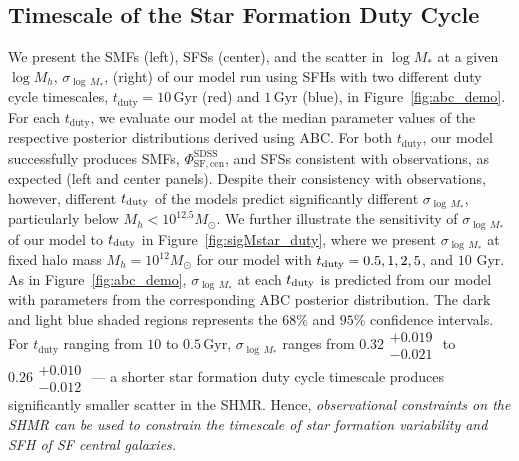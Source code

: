 \documentclass[12pt, letterpaper, preprint, tighten]{aastex62}
\begin{document}
\subsection{Timescale of the Star Formation Duty Cycle} \label{sec:sfdutycycle}
We present the SMFs (left), SFSs (center), and the scatter in $\log M_*$ at a 
given $\log M_h$, $\sigma_{\log\,M_*}$, (right) of our model run using SFHs with 
two different duty cycle timescales, $t_\mathrm{duty} = 10\,\mathrm{Gyr}$ (red) 
and $1\,\mathrm{Gyr}$ (blue), in Figure~\ref{fig:abc_demo}. For each 
$t_\mathrm{duty}$, we evaluate our model at the median parameter values of the respective posterior distributions derived 
using ABC. For both $t_\mathrm{duty}$, our model successfully produces SMFs, 
$\Phi^\mathrm{SDSS}_\mathrm{SF,cen}$, and SFSs consistent with observations, 
as expected (left and center panels). Despite their consistency with observations, 
however, different $t_{\rm duty}$ of the models predict significantly different 
$\sigma_{\log\,M_*}$, particularly below $M_h < 10^{12.5}M_\odot$. We further
illustrate the sensitivity of $\sigma_{\log\,M_*}$ of our model to $t_{\rm duty}$
in Figure~\ref{fig:sigMstar_duty}, where we present $\sigma_{\log\,M_*}$ at
fixed halo mass $M_h = 10^{12} M_\odot$ for our model with $t_{\rm duty} = 0.5, 1, 2, 5$, 
and $10$ Gyr. As in Figure~\ref{fig:abc_demo}, $\sigma_{\log\,M_*}$ at each $t_{\rm duty}$ 
is predicted from our model with parameters from the corresponding ABC posterior 
distribution. The dark and light blue shaded regions represents the $68\%$ and $95\%$ 
confidence intervals. For $t_\mathrm{duty}$ ranging from $10$ to $0.5\,\mathrm{Gyr}$,
$\sigma_{\log\,M_*}$ ranges from 
$0.32\substack{+0.019\\ -0.021}$ to $0.26\substack{+0.010\\-0.012}$
--- a shorter star formation duty cycle timescale produces significantly 
smaller scatter in the SHMR. Hence, \emph{observational constraints on 
the SHMR can be used to constrain the timescale of star formation variability 
and SFH of SF central galaxies.} 
\end{document}
